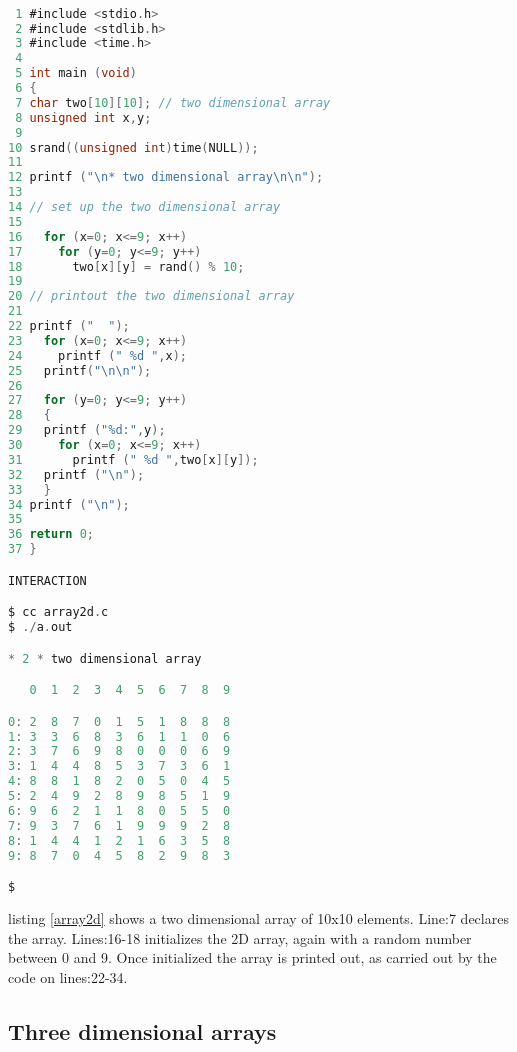 \begin{lstlisting}[language=C,showstringspaces=false,caption={File: array2d.c, two dimensional array},captionpos=b,label=array2d]

 1 #include <stdio.h>
 2 #include <stdlib.h>
 3 #include <time.h>
 4 
 5 int main (void)
 6 {
 7 char two[10][10]; // two dimensional array
 8 unsigned int x,y;
 9 
10 srand((unsigned int)time(NULL));
11 
12 printf ("\n* two dimensional array\n\n");
13 
14 // set up the two dimensional array 
15 
16   for (x=0; x<=9; x++)
17     for (y=0; y<=9; y++)
18       two[x][y] = rand() % 10;
19    
20 // printout the two dimensional array
21 
22 printf ("  ");
23   for (x=0; x<=9; x++)  
24     printf (" %d ",x);
25   printf("\n\n");
26 
27   for (y=0; y<=9; y++)
28   {
29   printf ("%d:",y);
30     for (x=0; x<=9; x++)
31       printf (" %d ",two[x][y]);
32   printf ("\n");
33   }
34 printf ("\n");
35 
36 return 0;
37 }

INTERACTION

$ cc array2d.c
$ ./a.out

* 2 * two dimensional array

   0  1  2  3  4  5  6  7  8  9 

0: 2  8  7  0  1  5  1  8  8  8 
1: 3  3  6  8  3  6  1  1  0  6 
2: 3  7  6  9  8  0  0  0  6  9 
3: 1  4  4  8  5  3  7  3  6  1 
4: 8  8  1  8  2  0  5  0  4  5 
5: 2  4  9  2  8  9  8  5  1  9 
6: 9  6  2  1  1  8  0  5  5  0 
7: 9  3  7  6  1  9  9  9  2  8 
8: 1  4  4  1  2  1  6  3  5  8 
9: 8  7  0  4  5  8  2  9  8  3 

$
\end{lstlisting}


listing \ref{array2d} shows a two dimensional array of 10x10 elements. Line:7 declares the array. Lines:16-18 initializes the 2D array, again with a random number between 0 and 9. Once initialized the array is printed out, as carried out by the code on lines:22-34.

\subsection{Three dimensional arrays}


